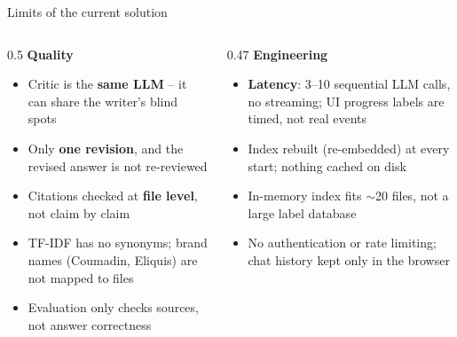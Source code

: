 \documentclass[aspectratio=169,11pt]{beamer}
\begin{document}
\begin{frame}{Limits of the current solution}
  \begin{columns}[T]
    \begin{column}{0.5\textwidth}
      \textbf{Quality}
      \begin{itemize}
        \item Critic is the \textbf{same LLM} -- it can share the writer's blind spots
        \item Only \textbf{one revision}, and the revised answer is not re-reviewed
        \item Citations checked at \textbf{file level}, not claim by claim
        \item TF-IDF has no synonyms; brand names (Coumadin, Eliquis) are not mapped to files
        \item Evaluation only checks sources, not answer correctness
      \end{itemize}
    \end{column}
    \begin{column}{0.47\textwidth}
      \textbf{Engineering}
      \begin{itemize}
        \item \textbf{Latency}: 3--10 sequential LLM calls, no streaming; UI progress labels are timed, not real events
        \item Index rebuilt (re-embedded) at every start; nothing cached on disk
        \item In-memory index fits $\sim$20 files, not a large label database
        \item No authentication or rate limiting; chat history kept only in the browser
      \end{itemize}
    \end{column}
  \end{columns}
\end{frame}
\end{document}
